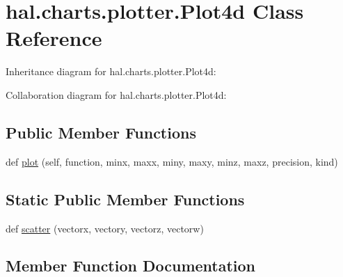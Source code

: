 \hypertarget{classhal_1_1charts_1_1plotter_1_1_plot4d}{}\section{hal.\+charts.\+plotter.\+Plot4d Class Reference}
\label{classhal_1_1charts_1_1plotter_1_1_plot4d}


Inheritance diagram for hal.\+charts.\+plotter.\+Plot4d\+:


Collaboration diagram for hal.\+charts.\+plotter.\+Plot4d\+:
\subsection*{Public Member Functions}
\begin{DoxyCompactItemize}
\item 
def \hyperlink{classhal_1_1charts_1_1plotter_1_1_plot4d_a0826f5d596a40fb6ec31f6f2636b55e9}{plot} (self, function, minx, maxx, miny, maxy, minz, maxz, precision, kind)
\end{DoxyCompactItemize}
\subsection*{Static Public Member Functions}
\begin{DoxyCompactItemize}
\item 
def \hyperlink{classhal_1_1charts_1_1plotter_1_1_plot4d_aa5b31430953600e79cdb0dd609d0e971}{scatter} (vectorx, vectory, vectorz, vectorw)
\end{DoxyCompactItemize}


\subsection{Member Function Documentation}
